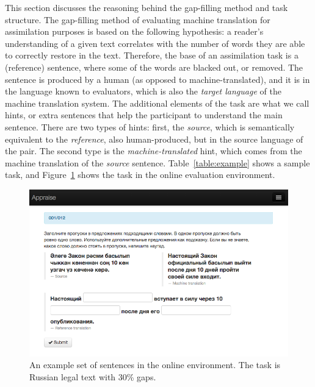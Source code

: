 \documentclass[11pt]{article}
\newcommand{\comment}[1]{}
\begin{document}
This section discusses the reasoning behind the gap-filling method and task structure. The gap-filling method 
of evaluating machine translation for assimilation purposes is based on the following hypothesis: a reader's understanding 
of a given text correlates with the number of words they are able to correctly restore in the text. Therefore, the 
base of an assimilation task is a (reference) sentence, where some of the words are blacked out, or removed. The sentence 
is produced by a human (as opposed to machine-translated), and it is in the language known to evaluators, which is also 
the \emph{target language} of the machine translation system.
The additional elements of the task are what we call hints, or extra sentences that help the participant to understand 
the main sentence. There are two types of hints: first, the \emph{source}, which is semantically equivalent to the \emph{reference}, 
also human-produced, but in the source language of the pair. The second type is the \emph{machine-translated} hint, which 
comes from the machine translation of the \emph{source} sentence. Table~\ref{table:example} shows a sample task, and Figure~\ref{figure:screenshot} shows the task in the online evaluation environment.
\begin{figure}
  \centering
\includegraphics[width=1.0\textwidth,resolution=144]{appraise-scr}
 \caption{An example set of sentences in the online environment. The task is Russian legal text with 30\% gaps.}
\label{figure:screenshot}
\end{figure}
\end{document}
